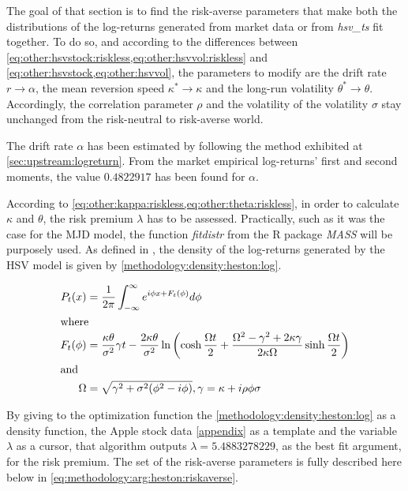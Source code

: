 \documentclass[12pt]{report}
\begin{document}
The goal of that section is to find the risk-averse parameters that make both the distributions of the log-returns generated from market data or from \textit{hsv\_ts} fit together.
To do so, and according to the differences between \cref{eq:other:hsvstock:riskless,eq:other:hsvvol:riskless} and \cref{eq:other:hsvstock,eq:other:hsvvol}, the parameters to modify are the drift rate $r \to \alpha$, the mean reversion speed $\kappa^{*} \to \kappa$ and the long-run volatility $\theta^* \to \theta$.
Accordingly, the correlation parameter $\rho$ and the volatility of the volatility $\sigma$ stay unchanged from the risk-neutral to risk-averse world.

The drift rate $\alpha$ has been estimated by following the method exhibited at \cref{sec:upstream:logreturn}. From the market empirical log-returns' first and second moments, the value $0.4822917$ has been found for $\alpha$.

According to \cref{eq:other:kappa:riskless,eq:other:theta:riskless}, in order to  calculate $\kappa$ and $\theta$, the risk premium $\lambda$ has to be assessed.
Practically, such as it was the case for the MJD model, the function \textit{fitdistr} from the R package \textit{MASS} will be purposely used. 
As defined in \citet{Adrian}, the density of the log-returns generated by the HSV model is given by \cref{methodology:density:heston:log}.

\begin{align}
P_t(x) &= \frac{1}{2 \pi} \int_{-\infty}^{\infty} e^{i \phi x + F_t(\phi)} d\phi \label{methodology:density:heston:log} \\
\intertext{where}
F_t(\phi) &= \frac{\kappa \theta}{\sigma^2} \gamma t -
  \frac{2 \kappa \theta}{\sigma ^2} \ln\left(
    \cosh \frac{\Omega t}{2} +
    \frac{\Omega^2 - \gamma^2 +2 \kappa \gamma}{2 \kappa \Omega} \sinh \frac{\Omega t}{2}
  \right) \notag \\
\intertext{and}
\Omega &= \sqrt{\gamma^2 + \sigma^2 (\phi^2 - i\phi)}, \notag
\gamma = \kappa + i \rho \phi \sigma \notag
\end{align}

By giving to the optimization function the \cref{methodology:density:heston:log} as a density function, the Apple stock data \cref{appendix} as a template and the variable $\lambda$ as a cursor, that algorithm outputs $\lambda = 5.4883278229$, as the best fit argument, for the risk premium.
The set of the risk-averse parameters is fully described here below in \ref{eq:methodology:arg:heston:riskaverse}.
\end{document}
